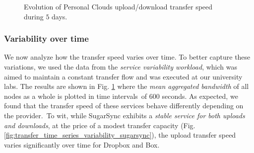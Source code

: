 \begin{figure}[t]
\center
   \caption{Evolution of Personal Clouds upload/download transfer speed during $5$ days.}
   \label{fig:transfer_time_series_variability}
	\vspace{-3mm}
\end{figure}


\medskip

\subsubsection*{Variability over time}
We now analyze how the
transfer speed varies over time. To better capture these variations, 
we used the data from the \textit{service variability workload}, 
which was aimed to maintain a constant transfer flow and was executed at our university labs.
The results are shown in Fig. \ref{fig:transfer_time_series_variability} 
where the \textit{mean aggregated bandwidth} of all nodes as a whole is plotted in time 
intervals~of $600$ seconds. As expected, we found that the transfer speed of these services behave
differently depending on the provider.~To wit, while SugarSync
exhibits a \textit{stable service for both uploads and downloads}, at
the price of a modest transfer capacity (Fig. \ref{fig:transfer_time_series_variability_sugarsync}), the upload transfer
speed varies significantly over time for Dropbox and Box.


